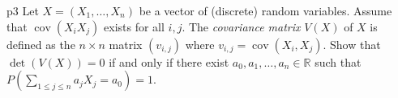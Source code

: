 \documentclass[a4paper, 11pt]{article}
\begin{document}

\begin{problem}{%
}{p3%
}
Let $X=\left(X_{1}, \ldots, X_{n}\right)$ be a vector of (discrete) random variables. Assume that $\operatorname{cov}\left(X_{i} X_{j}\right)$ exists for all $i, j$. The \textit{covariance matrix} $V(X)$ of $X$ is defined as the $n \times n$ matrix $\left(v_{i, j}\right)$ where $v_{i, j}=\operatorname{cov}\left(X_{i}, X_{j}\right)$. Show that $\operatorname{det}(V(X))=0$ if and only if there exist $a_{0}, a_{1}, \ldots, a_{n} \in \mathbb{R}$ such that $P\left(\sum\limits_{1 \leq j \leq n} a_{j} X_{j}=a_{0}\right)=1$.
\end{problem}
\end{document}
